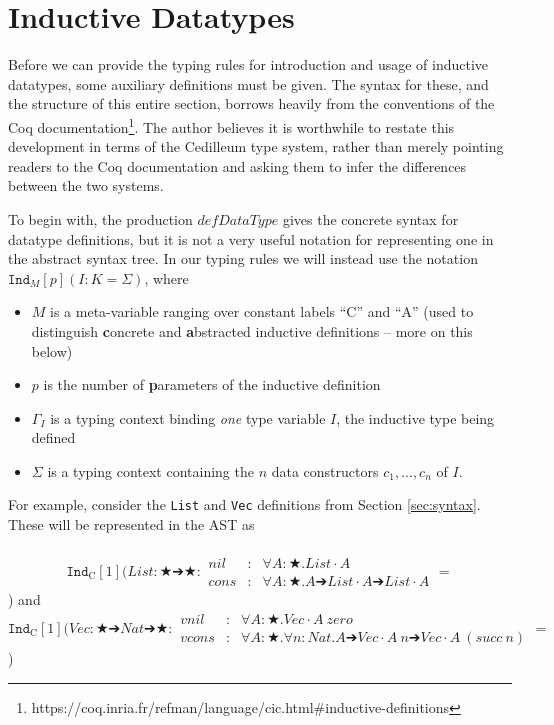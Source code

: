 \documentclass{article}
\newcommand{\indast}[5]{\texttt{Ind}_{#1} [#2] (#3 : #4 = #5)}
\begin{document}
\section{Inductive Datatypes}
\label{sec:ind-data}

Before we can provide the typing rules for introduction and usage of inductive
datatypes, some auxiliary definitions must be given. The syntax for these, and
the structure of this entire section, borrows heavily from the conventions of the Coq
documentation\footnote{https://coq.inria.fr/refman/language/cic.html\#inductive-definitions}.
The author believes it is worthwhile to restate this development in terms of the
Cedilleum type system, rather than merely pointing readers to the Coq
documentation and asking them to infer the differences between the two systems.

To begin with, the production $defDataType$ gives the concrete syntax for datatype definitions,
but it is not a very useful notation for representing one in the abstract syntax
tree. In our typing rules we will instead use the notation
$\indast{M}{p}{I}{K}{\Sigma}$, where

\begin{itemize}
\item $M$ is a meta-variable ranging over
  constant labels ``C'' and ``A'' (used to distinguish \textbf{c}oncrete and
  \textbf{a}bstracted inductive definitions -- more on this below)
\item $p$ is the number of \textbf{p}arameters of the inductive definition
\item $\Gamma_I$ is a typing context binding \textit{one} type variable $I$, the
  inductive type being defined
\item $\Sigma$ is a typing context containing the $n$ data constructors
  $c_1,...,c_n$ of $I$.
\end{itemize}

For example, consider the \texttt{List} and \texttt{Vec} definitions from
Section \ref{sec:syntax}. These will be represented in the AST as
\\ \\
\[\indast{\text{C}}{1}{List : ★ ➔ ★}
{\begin{array}{lcl}
   nil & : & ∀ A : ★ . List \cdot A
   \\ cons & : & ∀ A : ★ . A ➔ List \cdot A ➔ List \cdot A
 \end{array}
}\] and
\\
\[\indast{\text{C}}{1}{Vec : ★ ➔ Nat ➔ ★}
{\begin{array}{lcl}
   vnil & : & ∀ A: ★.Vec \cdot\!A\ zero
   \\ vcons & : & ∀ A: ★. ∀ n :Nat. A ➔ Vec \cdot\!A\ n ➔ Vec \cdot\!A\ (succ\ n)
 \end{array}
}\]
\end{document}
